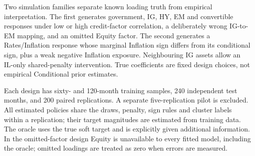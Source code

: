 \documentclass[a4paper,review]{cas-sc}
\begin{document}
Two simulation families separate known loading truth from empirical interpretation. The first generates government, IG, HY, EM and convertible responses under low or high credit-factor correlation, a deliberately wrong IG-to-EM mapping, and an omitted Equity factor. The second generates a Rates/Inflation response whose marginal Inflation sign differs from its conditional sign, plus a weak negative Inflation exposure. Neighbouring IG assets allow an IL-only shared-penalty intervention. True coefficients are fixed design choices, not empirical Conditional prior estimates.

Each design has sixty- and 120-month training samples, 240 independent test months, and 200 paired replications. A separate five-replication pilot is excluded. All estimated policies share the draws, penalty, sign rules and cluster labels within a replication; their target magnitudes are estimated from training data. The oracle uses the true soft target and is explicitly given additional information. In the omitted-factor design Equity is unavailable to every fitted model, including the oracle; omitted loadings are treated as zero when errors are measured.
\end{document}
